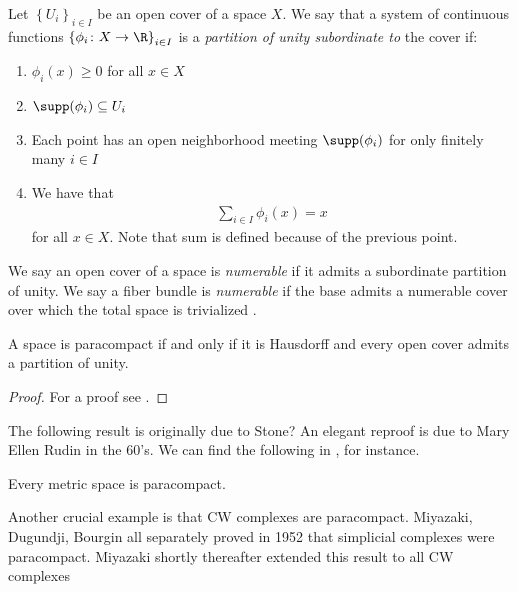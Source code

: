 \documentclass[11pt]{book}
\begin{document}
\begin{definition}\label{def:partition-of-unity} 
Let $\left\{ U_i \right\}_{i\in I}$ be an open cover of a space $X$. We say that a system of continuous functions $\left\{ \phi_i \colon X \to \R \right\}_{i\in I}$ is a \emph{partition of unity subordinate to} the cover if:
\begin{enumerate}
    \item $\phi_i(x) \ge 0$ for all $x\in X$
    \item $\supp(\phi_i) \subseteq U_i$
    \item Each point has an open neighborhood meeting $\supp(\phi_i)$ for only finitely many $i\in I$
    \item We have that
    \begin{align*}
        \sum_{i\in I}\phi_i(x) = x
    \end{align*}
    for all $x\in X$. Note that sum is defined because of the previous point.
\end{enumerate}
\end{definition}

\begin{definition}\label{def:numerable-open-cover}
We say an open cover of a space is \emph{numerable} if it admits a subordinate partition of unity. We say a fiber bundle is \emph{numerable} if the base admits a numerable cover over which the total space is trivialized \cite[7.1]{doldPartitionsUnityTheory1963}.
\end{definition}

\begin{theorem}\label{thm:paracompact-partition-unity} 
A space is paracompact if and only if it is Hausdorff and every open cover admits a partition of unity.
\end{theorem}
\begin{proof} For a proof see \cite[pp.~30--31]{Hirzebruch}.
\end{proof}

The following result is originally due to Stone? An elegant reproof is due to Mary Ellen Rudin in the 60's. We can find the following in \cite[41.4]{Munkres}, for instance.

\begin{theorem}\label{thm:metric-space-paracompact} Every metric space is paracompact.
\end{theorem}

Another crucial example is that CW complexes are paracompact. Miyazaki, Dugundji, Bourgin all separately proved in 1952 that simplicial complexes were paracompact. Miyazaki shortly thereafter extended this result to all CW complexes
\end{document}
